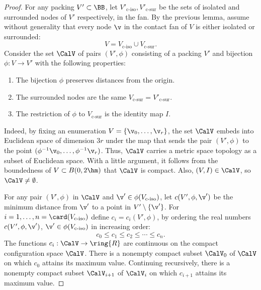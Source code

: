 \begin{proof} For any packing $V'\subset \BB$, let $V'_{\text{c-iso}},V'_{\text{c-sur}}$
  be the sets of isolated and surrounded nodes of $V'$
  respectively, in the  fan.  By the previous lemma,
  assume without generality that every node $\v$ in the contact fan
  of $V$ is either isolated or surrounded:
\[ 
V = V_{\text{c-iso}} \cup V_{\text{c-sur}}.
\] 
Consider the set $\CalV$ of pairs $(V',\phi)$ consisting of a packing $V'$
and bijection $\phi:V\to V'$ with the following properties:
\begin{enumerate}\wasitemize 
\item The bijection $\phi$ preserves distances from the origin.
\item The surrounded nodes are the same $V_{\text{c-sur}}=V'_{\text{c-sur}}$.
\item The restriction of $\phi$ to $V_{\text{c-sur}}$ is the identity map $I$.
\end{enumerate}\wasitemize 
{}%
%

Indeed, by fixing an enumeration $V = \{\v_0,\ldots,\v_r\}$, the set
$\CalV$ embeds into Euclidean space of dimension $3r$ under the map
that sends the pair $(V',\phi)$ to the point
$(\phi^{-1}\v_0,\ldots,\phi^{-1}\v_r)$.  Thus, $\CalV$ carries a
metric space topology as a subset of Euclidean space.  With a little
argument, it follows from the boundedness of $V\subset B(0,2\hm)$ that
$\CalV$ is compact.  Also, $(V,I)\in \CalV$, so $\CalV\ne\emptyset$.


For any pair $(V',\phi)$ in $\CalV$ and $\v'\in \phi(V_{\text{c-iso}})$, let
$c(V',\phi,\v')$ be the minimum distance from $\v'$ to a point in
$V'\setminus \{\v'\}$.  For $i=1,\ldots,n=\card(V_{\text{c-iso}})$ define
$c_i=c_i(V',\phi)$, by ordering the real numbers
$c(V',\phi,\v')$, $\v'\in\phi(V_{\text{c-iso}})$ in increasing order:
\[ 
c_0 \le c_1 \le c_2 \le \cdots \le c_n.
\] 
The functions $c_i:\CalV\to\ring{R}$ are  continuous on the
compact configuration space $\CalV$.  There is a nonempty compact
subset $\CalV_0$ of $\CalV$ on which $c_0$ attains its maximum
value. Continuing recursively, there is a nonempty compact subset
$\CalV_{i+1}$ of $\CalV_{i}$ on which $c_{i+1}$ attains its maximum value.
%
%


\end{proof}
